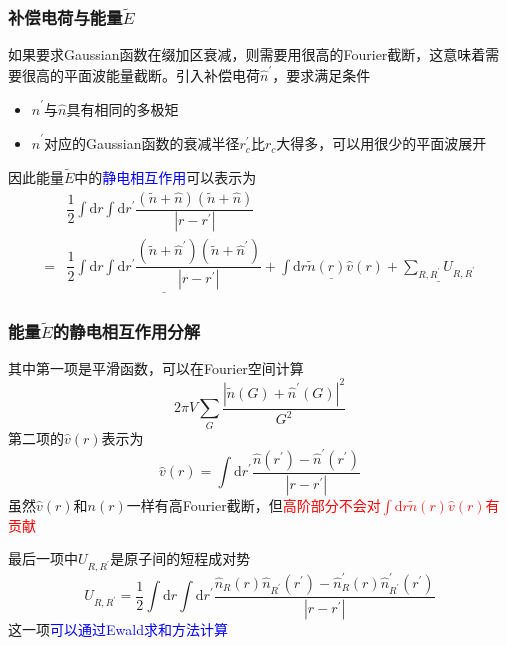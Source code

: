 \documentclass[cjk,slidestop,compress,mathserif,blue]{beamer}
\begin{document}
\frame
{
	\frametitle{补偿电荷与能量$\tilde E$}
	如果要求\textrm{Gaussian}函数在缀加区衰减，则需要用很高的\textrm{Fourier}截断，这意味着需要很高的平面波能量截断。引入补偿电荷$\hat n^{\prime}$，要求满足条件
	\begin{itemize}
		\item $\hat n^{\prime}$与$\hat n$具有相同的多极矩
		\item $\hat n^{\prime}$对应的\textrm{Gaussian}函数的衰减半径$r_c^{\prime}$比$r_c$大得多，可以用很少的平面波展开
	\end{itemize}
	因此能量$\tilde E$中的\textcolor{blue}{静电相互作用}可以表示为
	\begin{displaymath}
		\begin{aligned}
			&\dfrac12\int\mathrm{d}r\int\mathrm{d}r^{\prime}\dfrac{(\tilde n+\hat n)(\tilde n+\hat n)}{|r-r^{\prime}|}\\
			=&\underline{\dfrac12\int\mathrm{d}r\int\mathrm{d}r^{\prime}\dfrac{(\tilde n+\hat n^{\prime})(\tilde n+\hat n^{\prime})}{|r-r^{\prime}|}}
			+\underline{\int\mathrm{d}r\tilde n(r)\hat v(r)}+\underline{\sum_{R,R^{\prime}}U_{R,R^{\prime}}}
		\end{aligned}
	\end{displaymath}
}

\frame
{
	\frametitle{能量$\tilde E$的静电相互作用分解}
	其中第一项是平滑函数，可以在\textrm{Fourier}空间计算
	$$2\pi V\sum_G\dfrac{|\tilde n(G)+\hat n^{\prime}(G)|^2}{G^2}$$
	第二项的$\hat v(r)$表示为
	$$\hat v(r)=\int\mathrm{d}r^{\prime}\dfrac{\hat n(r^{\prime})-\hat n^{\prime}(r^{\prime})}{|r-r^{\prime}|}$$
	虽然$\hat v(r)$和$n(r)$一样有高\textrm{Fourier}截断，但\textcolor{red}{高阶部分不会对$\int\mathrm{d}r\tilde n(r)\hat v(r)$有贡献}

	最后一项中$U_{R,R^{\prime}}$是原子间的短程成对势
	$$U_{R,R^{\prime}}=\dfrac12\int\mathrm{d}r\int\mathrm{d}r^{\prime}\dfrac{\hat n_R(r)\hat n_{R^{\prime}}(r^{\prime})-\hat n_R^{\prime}(r)\hat n_{R^{\prime}}^{\prime}(r^{\prime})}{|r-r^{\prime}|}$$
	这一项\textcolor{blue}{可以通过\textrm{Ewald}求和方法计算}
}
\end{document}
